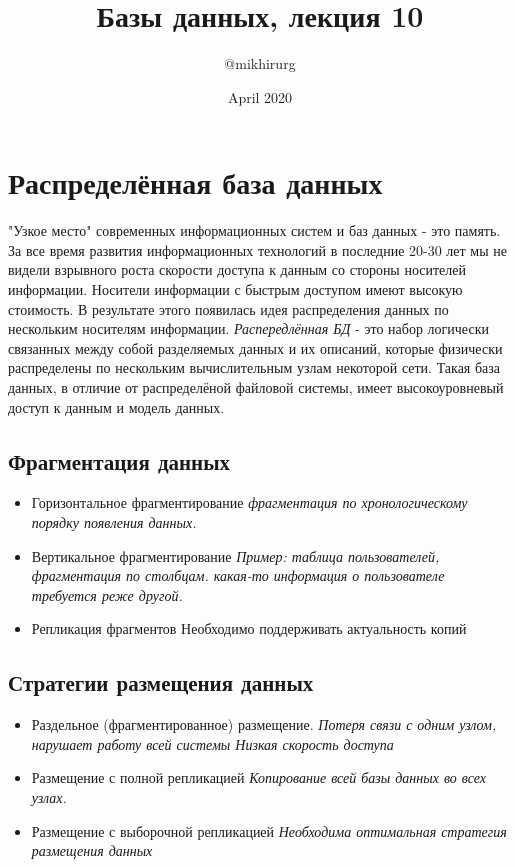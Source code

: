 \documentclass{article}
\title{Базы данных, лекция 10}
\author{@mikhirurg}
\date{April 2020}
\begin{document}
\maketitle

\section{Распределённая база данных}

"Узкое место" современных информационных систем и баз данных - это память. За все время развития информационных технологий в последние 20-30 лет мы не видели взрывного роста скорости доступа к данным со стороны носителей информации. Носители информации с быстрым доступом имеют высокую стоимость. В результате этого появилась идея распределения данных по нескольким носителям информации.
\newline \textit{Распередлённая БД} - это набор логически связанных между собой разделяемых данных и их описаний, которые физически распределены по нескольким вычислительным узлам некоторой сети.
\newline Такая база данных, в отличие от распределёной файловой системы, имеет высокоуровневый доступ к данным и модель данных.

\subsection{Фрагментация данных}
\begin{itemize}
    \item Горизонтальное фрагментирование
    \newline \textit{фрагментация по хронологическому порядку появления данных.}
    \item Вертикальное фрагментирование 
    \newline \textit{Пример: таблица пользователей, фрагментация по столбцам.
    \newline какая-то информация о пользователе требуется реже другой.}
    \item Репликация фрагментов 
    \newline Необходимо поддерживать актуальность копий
\end{itemize}

\subsection{Стратегии размещения данных}
\begin{itemize}
    \item Раздельное (фрагментированное) размещение.
    \newline \textit{Потеря связи с одним узлом, нарушает работу всей системы
    \newline Низкая скорость доступа}
    \item Размещение с полной репликацией
    \newline \textit{Копирование всей базы данных во всех узлах.}
    \item Размещение с выборочной репликацией
    \newline \textit{Необходима оптимальная стратегия размещения данных}
\end{itemize}
\end{document}
